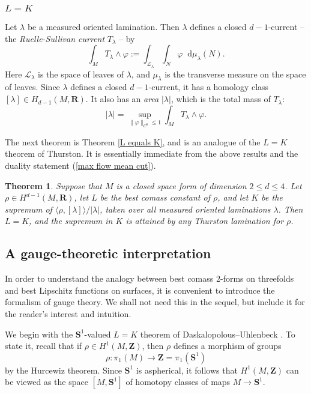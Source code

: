 \documentclass[reqno,11pt]{amsart}
\newcommand{\ZZ}{\mathbf{Z}}
\newcommand{\RR}{\mathbf{R}}
\newcommand{\Sph}{\mathbf S}
\newcommand*\dif{\mathop{}\!\mathrm{d}}
\newcommand{\dfn}[1]{\emph{#1}\index{#1}}
\newtheorem{mainthm}{Theorem}
\theoremstyle{definition}
\numberwithin{equation}{section}
\begin{document}
\subsubsection{\texorpdfstring{$L = K$}{L equals K}}
Let $\lambda$ be a measured oriented lamination.
Then $\lambda$ defines a closed $d-1$-current -- the \dfn{Ruelle-Sullivan current} $T_\lambda$ -- by 
$$\int_M T_\lambda \wedge \varphi := \int_{\mathscr L_\lambda} \int_N \varphi \dif \mu_\lambda(N).$$
Here $\mathscr L_\lambda$ is the space of leaves of $\lambda$, and $\mu_\lambda$ is the transverse measure on the space of leaves.
Since $\lambda$ defines a closed $d-1$-current, it has a homology class $[\lambda] \in H_{d - 1}(M, \RR)$.
It also has an \dfn{area} $|\lambda|$, which is the total mass of $T_\lambda$:
$$|\lambda| = \sup_{\|\varphi\|_{C^0} \leq 1} \int_M T_\lambda \wedge \varphi.$$

The next theorem is Theorem \ref{L equals K}, and is an analogue of the $L = K$ theorem of Thurston.
It is essentially immediate from the above results and the duality statement (\ref{max flow mean cut}).

\begin{mainthm}\label{L is K}
Suppose that $M$ is a closed space form of dimension $2 \leq d \leq 4$.
Let $\rho \in H^{d - 1}(M, \RR)$, let $L$ be the best comass constant of $\rho$, and let $K$ be the supremum of $\langle \rho, [\lambda]\rangle/|\lambda|$, taken over all measured oriented laminations $\lambda$.
Then $L = K$, and the supremum in $K$ is attained by any Thurston lamination for $\rho$.
\end{mainthm}


\subsection{A gauge-theoretic interpretation}
In order to understand the analogy between best comass $2$-forms on threefolds and best Lipschitz functions on surfaces, it is convenient to introduce the formalism of gauge theory.
We shall not need this in the sequel, but include it for the reader's interest and intuition.

We begin with the $\Sph^1$-valued $L = K$ theorem of Daskalopolous--Uhlenbeck \cite[Theorem 5.8]{daskalopoulos2020transverse}.
To state it, recall that if $\rho \in H^1(M, \ZZ)$, then $\rho$ defines a morphism of groups
$$\rho: \pi_1(M) \to \ZZ = \pi_1(\Sph^1)$$
by the Hurcewiz theorem.
Since $\Sph^1$ is aspherical, it follows that $H^1(M, \ZZ)$ can be viewed as the space $[M, \Sph^1]$ of homotopy classes of maps $M \to \Sph^1$.
\end{document}
